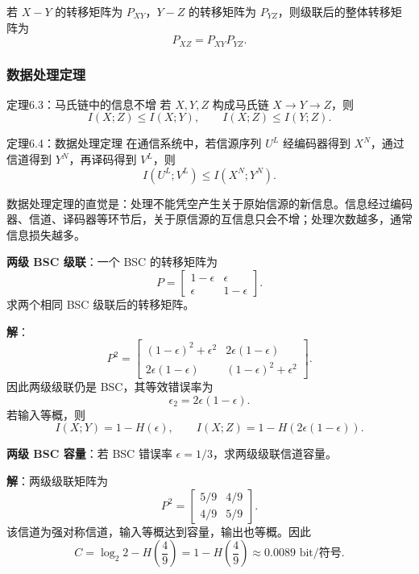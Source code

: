 若 $X-Y$ 的转移矩阵为 $P_{XY}$，$Y-Z$ 的转移矩阵为 $P_{YZ}$，则级联后的整体转移矩阵为
\[
P_{XZ}=P_{XY}P_{YZ}.
\]

\subsubsection{数据处理定理}

\begin{theoremBox}{定理6.3：马氏链中的信息不增}
若 $X,Y,Z$ 构成马氏链 $X\to Y\to Z$，则
\[
I(X;Z)\le I(X;Y),
\qquad
I(X;Z)\le I(Y;Z).
\]
\end{theoremBox}

\begin{theoremBox}{定理6.4：数据处理定理}
在通信系统中，若信源序列 $U^L$ 经编码器得到 $X^N$，通过信道得到 $Y^N$，再译码得到 $V^L$，则
\[
I(U^L;V^L)\le I(X^N;Y^N).
\]
\end{theoremBox}

数据处理定理的直觉是：处理不能凭空产生关于原始信源的新信息。信息经过编码器、信道、译码器等环节后，关于原信源的互信息只会不增；处理次数越多，通常信息损失越多。

\begin{example}
\label{ex:ch6-cascaded-bsc}
\textbf{两级 BSC 级联}：一个 BSC 的转移矩阵为
\[
P=\begin{bmatrix}1-\epsilon&\epsilon\\ \epsilon&1-\epsilon\end{bmatrix}.
\]
求两个相同 BSC 级联后的转移矩阵。

\textbf{解}：
\[
P^2=\begin{bmatrix}
(1-\epsilon)^2+\epsilon^2 & 2\epsilon(1-\epsilon)\\
2\epsilon(1-\epsilon)&(1-\epsilon)^2+\epsilon^2
\end{bmatrix}.
\]
因此两级级联仍是 BSC，其等效错误率为
\[
\epsilon_2=2\epsilon(1-\epsilon).
\]
若输入等概，则
\[
I(X;Y)=1-H(\epsilon),
\qquad
I(X;Z)=1-H(2\epsilon(1-\epsilon)).
\]
\end{example}

\begin{example}
\label{ex:ch6-cascaded-bsc-capacity}
\textbf{两级 BSC 容量}：若 BSC 错误率 $\epsilon=1/3$，求两级级联信道容量。

\textbf{解}：两级级联矩阵为
\[
P^2=\begin{bmatrix}
5/9&4/9\\
4/9&5/9
\end{bmatrix}.
\]
该信道为强对称信道，输入等概达到容量，输出也等概。因此
\[
C=\log_2 2-H\left(\frac{4}{9}\right)
=1-H\left(\frac49\right)
\approx0.0089\text{ bit/符号}.
\]
\end{example}

